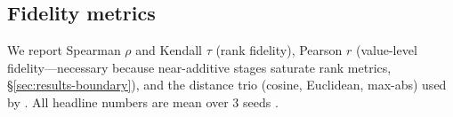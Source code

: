 \subsection{Fidelity metrics}
We report Spearman $\rho$ and Kendall $\tau$ (rank fidelity), Pearson $r$
(value-level fidelity---necessary because near-additive stages saturate rank
metrics, \S\ref{sec:results-boundary}), and the distance trio (cosine,
Euclidean, max-abs) used by \citet{liu2022gtg}. All headline numbers are
mean over 3 seeds .
